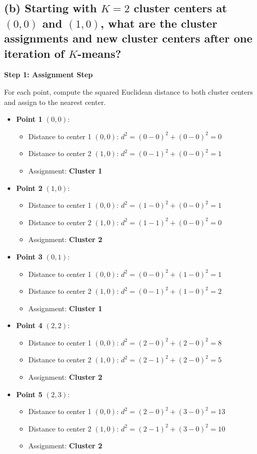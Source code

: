 \documentclass[11pt]{article}
\begin{document}
\subsection*{(b) Starting with $K=2$ cluster centers at $(0,0)$ and $(1,0)$, what are the cluster assignments and new cluster centers after one iteration of $K$-means?}

\textbf{Step 1: Assignment Step}

For each point, compute the squared Euclidean distance to both cluster centers and assign to the nearest center.

\begin{itemize}
\item \textbf{Point 1} $(0,0)$:
  \begin{itemize}
  \item Distance to center 1 $(0,0)$: $d^2 = (0-0)^2 + (0-0)^2 = 0$
  \item Distance to center 2 $(1,0)$: $d^2 = (0-1)^2 + (0-0)^2 = 1$
  \item Assignment: \textbf{Cluster 1}
  \end{itemize}

\item \textbf{Point 2} $(1,0)$:
  \begin{itemize}
  \item Distance to center 1 $(0,0)$: $d^2 = (1-0)^2 + (0-0)^2 = 1$
  \item Distance to center 2 $(1,0)$: $d^2 = (1-1)^2 + (0-0)^2 = 0$
  \item Assignment: \textbf{Cluster 2}
  \end{itemize}

\item \textbf{Point 3} $(0,1)$:
  \begin{itemize}
  \item Distance to center 1 $(0,0)$: $d^2 = (0-0)^2 + (1-0)^2 = 1$
  \item Distance to center 2 $(1,0)$: $d^2 = (0-1)^2 + (1-0)^2 = 2$
  \item Assignment: \textbf{Cluster 1}
  \end{itemize}

\item \textbf{Point 4} $(2,2)$:
  \begin{itemize}
  \item Distance to center 1 $(0,0)$: $d^2 = (2-0)^2 + (2-0)^2 = 8$
  \item Distance to center 2 $(1,0)$: $d^2 = (2-1)^2 + (2-0)^2 = 5$
  \item Assignment: \textbf{Cluster 2}
  \end{itemize}

\item \textbf{Point 5} $(2,3)$:
  \begin{itemize}
  \item Distance to center 1 $(0,0)$: $d^2 = (2-0)^2 + (3-0)^2 = 13$
  \item Distance to center 2 $(1,0)$: $d^2 = (2-1)^2 + (3-0)^2 = 10$
  \item Assignment: \textbf{Cluster 2}
  \end{itemize}
\end{itemize}
\end{document}
